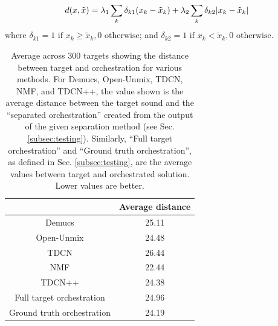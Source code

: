 \documentclass{article}
\begin{document}
    \begin{equation}\label{eqn:distance}
d(x, \tilde{x}) =\lambda_1 \sum_k \delta_{k1}(x_k - \tilde{x}_k) + \lambda_2 \sum_k \delta_{k2}|x_k - \tilde{x  }_k| \\
\end{equation}
where $\delta_{k1} = 1 \text{  if  } x_k \ge \tilde{x}_k, 0 \text{  otherwise}$; and $\delta_{k2} = 1 \text{  if  } x_k < \tilde{x}_k, 0 \text{  otherwise}$.
  
  
  \begin{table}[t]
    \begin{center}
      \begin{tabular}{|c|c|}
        \hline
        & Average distance \\
        \hline
        Demucs & 25.11 \\
        \hline
        Open-Unmix & 24.48\\
        \hline
        TDCN & 26.44\\
        \hline
        NMF & 22.44 \\
        \hline
        TDCN++ & 24.38 \\
        \hline
        Full target orchestration & 24.96 \\
        \hline
        Ground truth orchestration & 24.19 \\
        \hline
      \end{tabular}
    \end{center}
    \caption{Average across 300 targets showing the distance between target and orchestration for various methods. For Demucs, Open-Unmix, TDCN, NMF, and TDCN++, the value shown is the average distance between the target sound and the ``separated orchestration'' created from the output of the given separation method (see Sec. \ref{subsec:testing}). Similarly, ``Full target orchestration'' and ``Ground truth orchestration'', as defined in Sec. \ref{subsec:testing}, are the average values between target and orchestrated solution. Lower values are better.}
    \label{tab:distances}
  \end{table}
  
\end{document}
